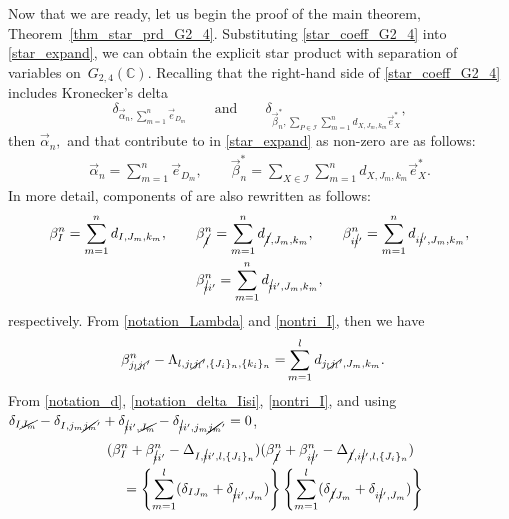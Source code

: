 \documentclass[10pt,a4paper]{amsart}
\numberwithin{equation}{section}
\begin{document}
Now that we are ready, let us begin the proof of the main theorem, Theorem~\ref{thm_star_prd_G2_4}.
Substituting \eqref{star_coeff_G2_4} into
\eqref{star_expand}, we can obtain the explicit star product with separation of variables on~$G_{2,4}(\mathbb{C})$. Recalling that the right-hand side of \eqref{star_coeff_G2_4} includes Kronecker's delta
\[
 \delta_{
 \vec{\alpha}_{n},
 \sum_{m=1}^{n}
 \vec{e}_{D_{m}}
 }
\qquad \text{and}\qquad
 \delta_{
 \vec{\beta}_{n}^{\ast},
 \sum_{
 P
 \in
 \mathcal{I}
 }
 \sum_{m=1}^{n}
 d_{
 X,
 J_{m},
 k_{m}
 }
 \vec{e}_{X}^{\ast} },
\]
then
$
\vec{\alpha}_{n},
$
and
that contribute to
in %
\eqref{star_expand} as non-zero are as follows:
\begin{align*}
 \vec{\alpha}_{n}
 =
 \sum_{m=1}^{n}
 \vec{e}_{D_{m}},
 \qquad
 \vec{\beta}_{n}^{\ast}
 =
 \sum_{
 X
 \in
 \mathcal{I}
 }
 \sum_{m=1}^{n}
 d_{
 X,
 J_{m},
 k_{m}
 }
 \vec{e}_{X}^{\ast}.
\end{align*}
In more detail, components of  are also rewritten as follows:
\begin{gather}
 \beta_{I}^{n}
 =
 \sum_{m=1}^{n}
 d_{
 I,
 J_{m},
 k_{m}
 },
 \qquad
 \beta_{\cancel{I}}^{n}
 =
 \sum_{m=1}^{n}
 d_{
 \cancel{I},
 J_{m},
 k_{m}
 },
 \qquad
 \beta_{i\cancel{i}'}^{n}
 =
 \sum_{m=1}^{n}
 d_{
 i\cancel{i}',
 J_{m},
 k_{m}
 },\nonumber
 \\
 \beta_{\cancel{i}i'}^{n}
 =
 \sum_{m=1}^{n}
 d_{
 \cancel{i}i',
 J_{m},
 k_{m}
 },
 \label{nontri_I}
\end{gather}
respectively.
From \eqref{notation_Lambda} and \eqref{nontri_I}, then we have
\begin{align*}
 \beta_{j_{l}\cancel{j_{l}}'}^{n}
 -
 \Lambda_{
 l,
 j_{l}\cancel{j_{l}}',
 \{
 J_{i}
 \}_{n},
 \{
 k_{i}
 \}_{n}
 }
 =&
 \sum_{m=1}^{l}
 d_{
 j_{l}\cancel{j_{l}}',
 J_{m},
 k_{m}
 }
 .
\end{align*}
From \eqref{notation_d}, \eqref{notation_delta_Iisi}, \eqref{nontri_I}, and using
$
\delta_{I\cancel{J_{m}}}
-
\delta_{I,j_{m}\cancel{j_{m}}'}
+
\delta_{\cancel{i}i',\cancel{J_{m}}}
-
\delta_{\cancel{i}i',j_{m}\cancel{j_{m}}'}
=
0
$,
\begin{gather*}
 (
 \beta_{I}^{n}
 +
 \beta_{\cancel{i}i'}^{n}
 -
 \Delta_{
 I,
 \cancel{i}i',
 l,
 \{
 J_{i}
 \}_{n}
 }
 )
 (
 \beta_{\cancel{I}}^{n}
 +
 \beta_{i\cancel{i}'}^{n}
 -
 \Delta_{
 \cancel{I},
 i\cancel{i}',
 l,
 \{
 J_{i}
 \}_{n}
 }
 )\\
 \qquad
 =
 \left\{
 \sum_{m=1}^{l}
 (
 \delta_{IJ_{m}}
 +
 \delta_{\cancel{i}i',J_{m}}
 )
 \right\}
 \left\{
 \sum_{m=1}^{l}
 (
 \delta_{\cancel{I}J_{m}}
 +
 \delta_{i\cancel{i}',J_{m}}
 )
 \right\}
\end{gather*}
\end{document}
